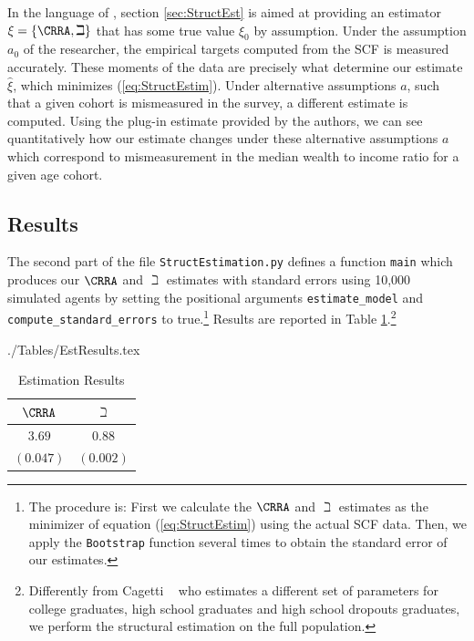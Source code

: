 \documentclass[titlepage, headings=optiontotocandhead]{\econtex}
\begin{document}
In the language of \cite{andrews2017measuring}, section \ref{sec:StructEst} is aimed at providing an
estimator $\xi =\{\CRRA ,{\beth}\}$ that has some true value $\xi_0 $ by assumption. Under the assumption $a_0$ of the 
researcher, the empirical targets computed from the SCF is measured accurately. These moments of the data are precisely
what determine our estimate $\hat{\xi}$, which minimizes (\ref{eq:StructEstim}). Under alternative assumptions $a$, 
such that a given cohort is mismeasured in the survey, a different estimate is computed. Using the plug-in estimate
provided by the authors, we can see quantitatively how our estimate changes under these alternative assumptions $a$ which correspond 
to mismeasurement in the median wealth to income ratio for a given age cohort. 

\subsection{Results}
The second part of the file \texttt{StructEstimation.py}
defines a function \texttt{main} which produces our $\CRRA$ and
${\beth}$ estimates with standard errors using 10,000 simulated
agents by setting the positional arguments \texttt{estimate\_model} and
\texttt{compute\_standard\_errors} to true.\footnote{The procedure is: First we calculate the $\CRRA$ and
  ${\beth}$ estimates as the minimizer of equation
  (\ref{eq:StructEstim}) using the actual SCF data. Then, we apply the
  \texttt{Bootstrap} function several times to obtain the standard
  error of our estimates.} Results are reported in Table
\ref{tab:EstResults}.\footnote{Differently from Cagetti
  ~\citeyearpar{cagettiWprofiles} who estimates a different set of
  parameters for college graduates, high school graduates and high
  school dropouts graduates, we perform the structural estimation on
  the full population.}


\begin{verbatimwrite}{./Tables/EstResults.tex}
  \begin{table}[h]
    \caption{Estimation Results}\label{tab:EstResults}
    \center
    \begin{tabular}{cc}
      \hline
      $\CRRA $ & ${\beth}$\\
      \hline
      $3.69$ & $0.88$\\
      $(0.047)$ & $(0.002)$\\
      \hline
    \end{tabular}
  \end{table}
\end{verbatimwrite}
\unskip
\end{document}
